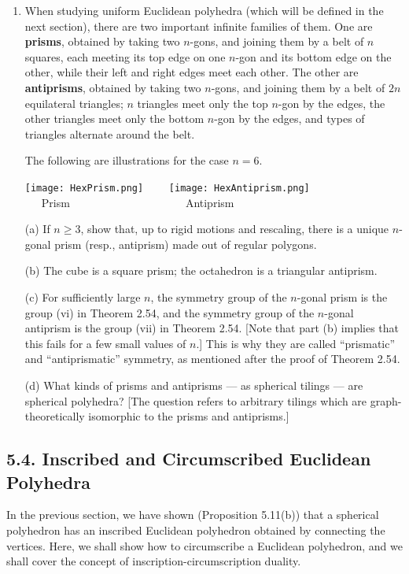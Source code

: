 \documentclass[leqno]{book}
\begin{document}
\begin{enumerate}
(d) Show that the area of a single face of the tiling equals the vertex angle defect of the corresponding vertex of $P$.  Conclude.

\item When studying uniform Euclidean polyhedra (which will be defined in the next section), there are two important infinite families of them.  One are \textbf{prisms}, obtained by taking two $n$-gons, and joining them by a belt of $n$ squares, each meeting its top edge on one $n$-gon and its bottom edge on the other, while their left and right edges meet each other.  The other are \textbf{antiprisms}, obtained by taking two $n$-gons, and joining them by a belt of $2n$ equilateral triangles; $n$ triangles meet only the top $n$-gon by the edges, the other triangles meet only the bottom $n$-gon by the edges, and types of triangles alternate around the belt. %

The following are illustrations for the case $n=6$.
\begin{center}
\texttt{[image: HexPrism.png]}~~~~
\texttt{[image: HexAntiprism.png]}\\
~~~Prism~~~~~~~~~~~~~~~~~~~~~Antiprism
\end{center}
(a) If $n\geqslant 3$, show that, up to rigid motions and rescaling, there is a unique $n$-gonal prism (resp., antiprism) made out of regular polygons.

(b) The cube is a square prism; the octahedron is a triangular antiprism.

(c) For sufficiently large $n$, the symmetry group of the $n$-gonal prism is the group (vi) in Theorem 2.54, and the symmetry group of the $n$-gonal antiprism is the group (vii) in Theorem 2.54.  [Note that part (b) implies that this fails for a few small values of $n$.]  This is why they are called ``prismatic'' and ``antiprismatic'' symmetry, as mentioned after the proof of Theorem 2.54.

(d) What kinds of prisms and antiprisms \---- as spherical tilings \---- are spherical polyhedra?  [The question refers to arbitrary tilings which are graph-theoretically isomorphic to the prisms and antiprisms.]
\end{enumerate}

\subsection*{5.4. Inscribed and Circumscribed Euclidean Polyhedra}
In the previous section, we have shown (Proposition 5.11(b)) that a spherical polyhedron has an inscribed Euclidean polyhedron obtained by connecting the vertices.  Here, we shall show how to circumscribe a Euclidean polyhedron, and we shall cover the concept of inscription-circumscription duality.
\end{document}

